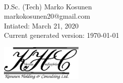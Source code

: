\vspace*{7cm}
 \\

\vspace*{2cm}
\noindent D.Sc. (Tech) Marko Kosunen\\
markokosunen20@gmail.com\\
Intiated: March 21, 2020\\
Current generated version: \today
\vfill

\includegraphics[width=4cm]{Figures/KHClogo.eps}
\newpage
{}
\newpage

